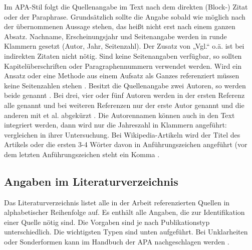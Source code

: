 Im APA-Stil folgt die Quellenangabe im Text nach dem direkten (Block-) Zitat oder der Paraphrase. Grundsätzlich sollte die Angabe sobald wie möglich nach der übernommenen Aussage stehen, das heißt nicht erst nach einem ganzen Absatz. Nachname, Erscheinungsjahr und Seitenangabe werden in runde Klammern gesetzt (Autor, Jahr, Seitenzahl). Der Zusatz von „Vgl.“ o.ä. ist bei indirekten Zitaten nicht nötig. Sind keine Seitenangaben verfügbar, so sollten Kapitelüberschriften oder Paragraphennummern verwendet werden. Wird ein Ansatz oder eine Methode aus einem Aufsatz als Ganzes referenziert müssen keine Seitenzahlen stehen \cite{mustermann2013test}. Besitzt die Quellenangabe zwei Autoren, so werden beide genannt \cite{mustermann2015gemeinsam}. Bei drei, vier oder fünf Autoren werden in der ersten Referenz alle genannt \cite*{mustermann2017viele} und bei weiteren Referenzen nur der erste Autor genannt und die anderen mit et al. abgekürzt \cite{mustermann2017viele}. Die Autorennamen können auch in den Text integriert werden, dann wird nur die Jahreszahl in Klammern angeführt: \citet{mustermann2013test} vergleichen in ihrer Untersuchung. Bei Wikipedia-Artikeln wird der Titel des Artikels oder die ersten 3-4 Wörter davon in Anführungszeichen angeführt (vor dem letzten Anführungszeichen steht ein Komma \cite{noauthor_wissenschaft_2020}.

\subsection{Angaben im Literaturverzeichnis}\label{subsubsec:angaben}

Das Literaturverzeichnis listet alle in der Arbeit referenzierten Quellen in alphabetischer Reihenfolge auf. Es enthält alle Angaben, die zur Identifikation einer Quelle nötig sind. Die Vorgaben sind je nach Publikationstyp unterschiedlich. Die wichtigsten Typen sind unten aufgeführt. Bei Unklarheiten oder Sonderformen kann im Handbuch der APA nachgeschlagen werden \cite{american2010concise}.


\makeatletter 
\renewcommand\BR@b@bibitem[2][]{\BR@bibitem[#1]{#2}\BR@c@bibitem{#2}}           
\makeatother

\nobibliography*%


